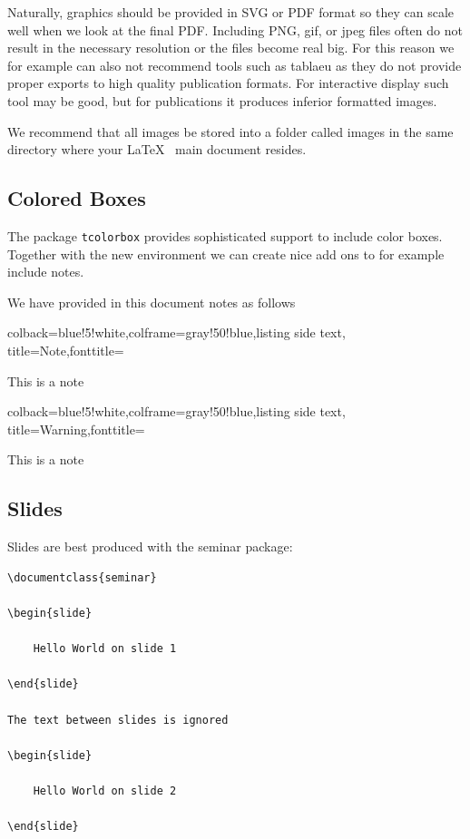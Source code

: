 Naturally, graphics should be provided in SVG or PDF format so they can
scale well when we look at the final PDF. Including PNG, gif, or jpeg
files often do not result in the necessary resolution or the files
become real big. For this reason we for example can also not recommend
tools such as tablaeu as they do not provide proper exports to high
quality publication formats. For interactive display such tool may be
good, but for publications it produces inferior formatted images.

We recommend that all images be stored into a folder called images in
the same directory where your \LaTeX~ main document resides.



\subsection{Colored Boxes}

The package \verb|tcolorbox| provides sophisticated support to include
color boxes. Together with the new environment we can create nice add
ons to for example include notes.


We have provided in this document notes as follows


\begin{tcblisting}{colback=blue!5!white,colframe=gray!50!blue,listing side text,  title=Note,fonttitle=\bfseries}
\begin{NOTE}
This is a note
\end{NOTE}
\end{tcblisting}

\begin{tcblisting}{colback=blue!5!white,colframe=gray!50!blue,listing side text,  title=Warning,fonttitle=\bfseries}
\begin{WARNING}
This is a note
\end{WARNING}
\end{tcblisting}


\subsection{Slides}\label{slides}

Slides are best produced with the seminar package:

\begin{verbatim}
\documentclass{seminar}

\begin{slide}

    Hello World on slide 1

\end{slide}

The text between slides is ignored

\begin{slide}

    Hello World on slide 2

\end{slide}
\end{verbatim}

